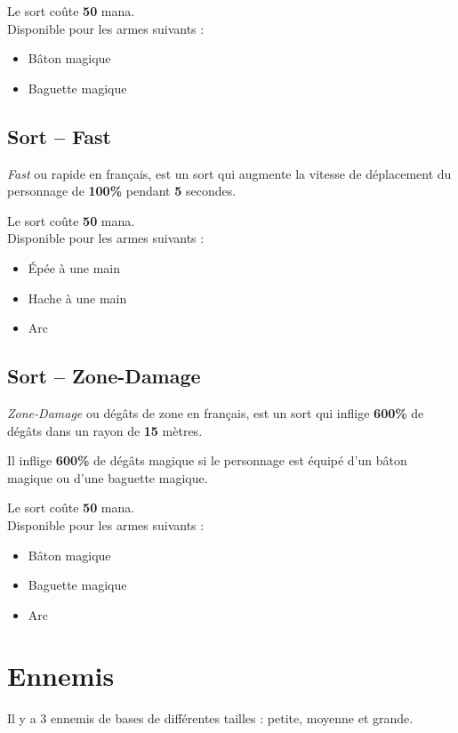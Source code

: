 \documentclass[11pt, a4paper, oneside]{report}
\begin{document}
Le sort coûte \textbf{50} mana.\\

Disponible pour les armes suivants :
\begin{multicols}{2}
\begin{itemize}
    \item Bâton magique
    \item Baguette magique
\end{itemize}
\end{multicols}
\subsection{Sort -- Fast}
\emph{Fast} ou rapide en français, est un sort qui augmente la vitesse de déplacement du personnage de \textbf{100\%} pendant \textbf{5} secondes.

Le sort coûte \textbf{50} mana.\\

Disponible pour les armes suivants :
\begin{multicols}{2}
\begin{itemize}
    \item Épée à une main
    \item Hache à une main
    \item Arc
\end{itemize}
\end{multicols}
\subsection{Sort -- Zone-Damage}
\emph{Zone-Damage} ou dégâts de zone en français, est un sort qui inflige \textbf{600\%} de dégâts dans un rayon de \textbf{15} mètres.

Il inflige \textbf{600\%} de dégâts magique si le personnage est équipé d'un bâton magique ou d'une baguette magique.

Le sort coûte \textbf{50} mana.\\

Disponible pour les armes suivants :
\begin{multicols}{2}
\begin{itemize}
    \item Bâton magique
    \item Baguette magique
    \item Arc
\end{itemize}
\end{multicols}
\section{Ennemis}
Il y a 3 ennemis de bases de différentes tailles : petite, moyenne et grande.
\end{document}
